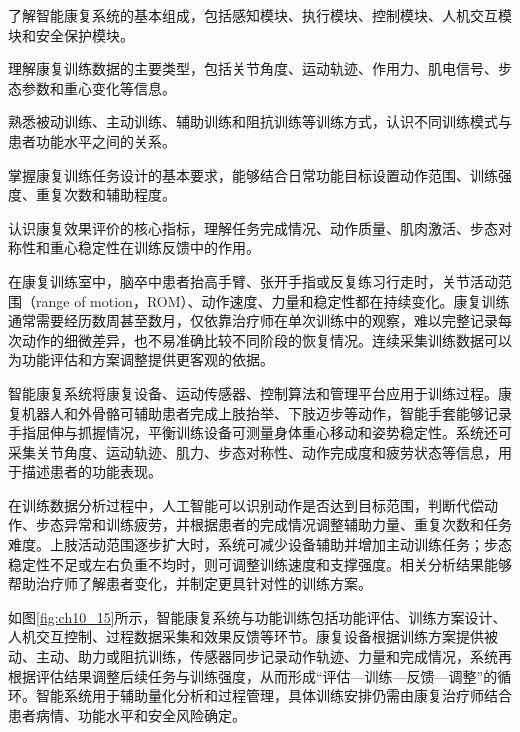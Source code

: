 \begin{sectionkeypoints}
\item 了解智能康复系统的基本组成，包括感知模块、执行模块、控制模块、人机交互模块和安全保护模块。
\item 理解康复训练数据的主要类型，包括关节角度、运动轨迹、作用力、肌电信号、步态参数和重心变化等信息。
\item 熟悉被动训练、主动训练、辅助训练和阻抗训练等训练方式，认识不同训练模式与患者功能水平之间的关系。
\item 掌握康复训练任务设计的基本要求，能够结合日常功能目标设置动作范围、训练强度、重复次数和辅助程度。
\item 认识康复效果评价的核心指标，理解任务完成情况、动作质量、肌肉激活、步态对称性和重心稳定性在训练反馈中的作用。
\end{sectionkeypoints}
在康复训练室中，脑卒中患者抬高手臂、张开手指或反复练习行走时，关节活动范围（range of motion，ROM）、动作速度、力量和稳定性都在持续变化。康复训练通常需要经历数周甚至数月，仅依靠治疗师在单次训练中的观察，难以完整记录每次动作的细微差异，也不易准确比较不同阶段的恢复情况。连续采集训练数据可以为功能评估和方案调整提供更客观的依据。

智能康复系统将康复设备、运动传感器、控制算法和管理平台应用于训练过程。康复机器人和外骨骼可辅助患者完成上肢抬举、下肢迈步等动作，智能手套能够记录手指屈伸与抓握情况，平衡训练设备可测量身体重心移动和姿势稳定性。系统还可采集关节角度、运动轨迹、肌力、步态对称性、动作完成度和疲劳状态等信息，用于描述患者的功能表现。

在训练数据分析过程中，人工智能可以识别动作是否达到目标范围，判断代偿动作、步态异常和训练疲劳，并根据患者的完成情况调整辅助力量、重复次数和任务难度。上肢活动范围逐步扩大时，系统可减少设备辅助并增加主动训练任务；步态稳定性不足或左右负重不均时，则可调整训练速度和支撑强度。相关分析结果能够帮助治疗师了解患者变化，并制定更具针对性的训练方案。

如图\ref{fig:ch10_15}所示，智能康复系统与功能训练包括功能评估、训练方案设计、人机交互控制、过程数据采集和效果反馈等环节。康复设备根据训练方案提供被动、主动、助力或阻抗训练，传感器同步记录动作轨迹、力量和完成情况，系统再根据评估结果调整后续任务与训练强度，从而形成“评估—训练—反馈—调整”的循环。智能系统用于辅助量化分析和过程管理，具体训练安排仍需由康复治疗师结合患者病情、功能水平和安全风险确定。


\par
\noindent\begin{minipage}{\textwidth}
\centering
{}
\label{fig:ch10_15}
\end{minipage}
\par

